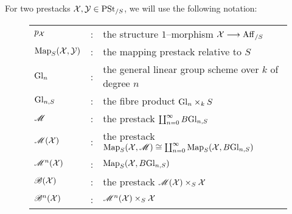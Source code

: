 \documentclass[11pt]{amsart}
\begin{document}
\begin{notn}
For two prestacks $\mathcal{X}, \mathcal{Y} \in \mathrm{PSt}_{/S}$, we will use the following
notation:
\begin{figure}[H]
\begin{tabularx}{\textwidth}{l c l}
$p_\mathcal{X}$ & : & the structure $1$--morphism $\mcX \to \Aff_{/S}$ \\
$\mathrm{Map}_S(\mathcal{X}, \mathcal{Y})$ & : & the mapping prestack relative to $S$ \\
$\mathrm{Gl}_{n}$ & : & the general linear group scheme over $k$ of degree $n$ \\
$\mathrm{Gl}_{n, S}$ & : & the fibre product $\mathrm{Gl}_{n} \times_k S$ \\
$\mathscr{M}$ & : & the prestack $\coprod_{n = 0}^\infty B\mathrm{Gl}_{n, S}$ \\
$\mathscr{M}(\mathcal{X})$ & : & the prestack
  $\mathrm{Map}_S(\mathcal{X}, \mathscr{M}) \cong \coprod_{n = 0}^\infty \mathrm{Map}_S(\mathcal{X}, B\mathrm{Gl}_{n, S})$ \\
$\mathscr{M}^n(\mathcal{X})$ & : & $\mathrm{Map}_S(\mathcal{X}, B\mathrm{Gl}_{n, S})$ \\
$\mathscr{B}(\mathcal{X})$ & : & the prestack $\mathscr{M}(\mathcal{X}) \times_S \mathcal{X}$ \\
$\mathscr{B}^n(\mathcal{X})$ & : & $\mathscr{M}^n(\mathcal{X}) \times_S \mathcal{X}$ \\
\end{tabularx}
\end{figure}
\end{notn}
\end{document}
